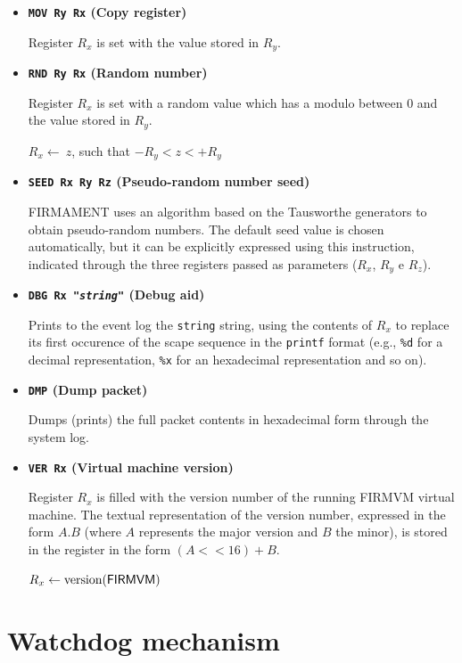 \documentclass[11pt]{article}
\begin{document}
\begin{itemize}

\item \textbf{\texttt{MOV Ry Rx} (Copy register)} 

Register $R_x$ is set with the value stored in $R_y$.

\item \textbf{\texttt{RND Ry Rx} (Random number)}


Register $R_x$ is set with a random value which has a modulo between 0 and the value stored in $R_y$.

$R_x \leftarrow \ z$, such that $-R_y < z < +R_y$

\item \textbf{\texttt{SEED Rx Ry Rz} (Pseudo-random number seed)} 

\textsf{FIRMAMENT} uses an algorithm based on the Tausworthe generators to obtain pseudo-random numbers. The default seed value is chosen automatically, but it can be explicitly expressed using this instruction, indicated through the three registers passed as parameters ($R_x$, $R_y$ e $R_z$).

\item \textbf{\texttt{DBG Rx "{\em string}"} (Debug aid)}

Prints to the event log the \texttt{string} string, using the 
contents of $R_x$ to replace its first occurence of the scape sequence in the \texttt{printf} format (e.g., \texttt{\%d} for a decimal representation, \texttt{\%x} for an hexadecimal representation and so on).

\item \textbf{\texttt{DMP} (Dump packet)} 

Dumps (prints) the full packet contents in hexadecimal form through the system log.

\item \textbf{\texttt{VER Rx} (Virtual machine version)} 

Register $R_x$ is filled with the version number of the running \textsf{FIRMVM} virtual machine. The textual representation of the version number, expressed in the form $A.B$ (where $A$ represents the major version and $B$ the minor), is stored in the register in the form $(A << 16) + B$.

$R_x \leftarrow \mbox{version(\textsf{FIRMVM})} $

\end{itemize}


\section{Watchdog mechanism}
\end{document}
